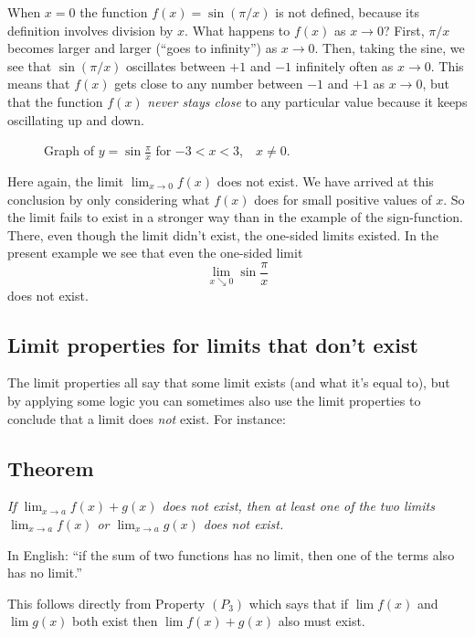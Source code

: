 When $x=0$ the function $f(x)=\sin(\pi /x)$ is not defined, because its
definition involves division by $x$.  What happens to $f(x)$ as $x\to0$?
First, $\pi /x$ becomes larger and larger (``goes to infinity'') as
$x\to0$.  Then, taking the sine, we see that $ \sin(\pi /x)$ oscillates
between $+1$ and $-1$ infinitely often as $x\to0$.  This means that $f(x)$
gets close to any number between $-1$ and $+1$ as $x\to0$, but that the
function $f(x)$ \emph{never stays close} to any particular value because it
keeps oscillating up and down.

\begin{figure}[ht]\centering
  
  \caption{Graph of $y = \sin\frac\pi x$ for $-3<x<3$,\ \ $x\neq0$.}
  \label{fig:03sinePiOverx}
\end{figure}

Here again, the limit $\lim_{x\to0}f(x)$ does not exist.  We have arrived
at this conclusion by only considering what $f(x)$ does for small positive
values of $x$.  So the limit fails to exist in a stronger way than in the
example of the sign-function. There, even though the limit didn't exist,
the one-sided limits existed.  In the present example we see that even the
one-sided limit
\[
\lim_{x\searrow 0} \sin \frac\pi x
\]
does not exist.

\subsection{Limit properties for limits that don't exist}
The limit properties all say that some limit exists (and what it's equal to),
but by applying some logic you can sometimes also use the limit properties to
conclude that a limit does \emph{not} exist.  For instance:

\subsection*{Theorem}%
\itshape
If $\lim_{x\to a}f(x) + g(x)$ does not exist, then at least one of the
two limits $\lim_{x\to a}f(x)$ or $\lim_{x\to a}g(x)$ does not exist.
\upshape\medskip

\noindent%
In English: ``if the sum of two functions has no limit, then one of
the terms also has no limit.''

This follows directly from Property $(P_3)$ which says that if $\lim
f(x)$ and $\lim g(x) $ both exist then $\lim f(x)+g(x)$ also must
exist.

